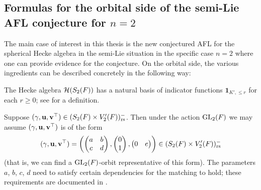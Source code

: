 \subsection{Formulas for the orbital side of the semi-Lie AFL conjecture for $n=2$}
\label{sec:semi_lie_2_intro_params}
The main case of interest in this thesis is the new conjectured AFL
for the spherical Hecke algebra in the semi-Lie situation in the
specific case $n = 2$ where one can provide evidence for the conjecture.
On the orbital side, the various ingredients can be described concretely
in the following way:
\begin{itemize}
  \ii The Hecke algebra $\mathcal H(S_2(F))$ has a natural basis of
  indicator functions $\mathbf{1}_{K', \le r}$ for each $r \ge 0$;
  see  for a definition.

  \ii Suppose ${(\gamma, \mathbf u, \mathbf v^\top)} \in (S_2(F) \times V'_2(F))_{\mathrm{rs}}^-$.
  Then under the action $\operatorname{GL}_2(F)$ we may assume ${(\gamma, \mathbf u, \mathbf v^\top)}$ is of the form
  \[
    {(\gamma, \mathbf u, \mathbf v^\top)} = \left( \begin{pmatrix} a & b \\ c & d \end{pmatrix},
      \begin{pmatrix} 0 \\ 1 \end{pmatrix},
      \begin{pmatrix} 0 & e \end{pmatrix} \right)
    \in (S_2(F) \times V_2'(F))_{\mathrm{rs}}^-
  \]
  (that is, we can find a $\operatorname{GL}_2(F)$-orbit representative of this form).
  The parameters $a$, $b$, $c$, $d$ need to satisfy certain dependencies
  for the matching to hold;
  these requirements are documented in .
\end{itemize}

